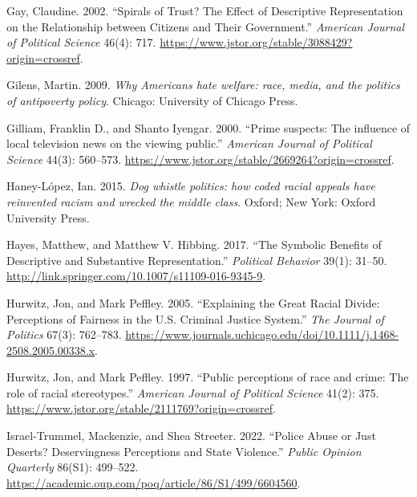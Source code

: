 \documentclass[
  12pt,
]{article}
\newlength{\cslhangindent}
\newlength{\cslentryspacingunit} %
\newenvironment{CSLReferences}[2] %
 {%
  \setlength{\parindent}{0pt}
  \ifodd #1
  \let\oldpar\par
  \def\par{\hangindent=\cslhangindent\oldpar}
  \fi
  \setlength{\parskip}{#2\cslentryspacingunit}
 }%
 {}
\begin{document}
\begin{CSLReferences}{1}{0}
\leavevmode{}%
Gay, Claudine. 2002. {``Spirals of Trust? The Effect of Descriptive
Representation on the Relationship between Citizens and Their
Government.''} \emph{American Journal of Political Science} 46(4): 717.
\url{https://www.jstor.org/stable/3088429?origin=crossref}.

\leavevmode{}%
Gilens, Martin. 2009. \emph{Why Americans hate welfare: race, media, and
the politics of antipoverty policy}. Chicago: University of Chicago
Press.

\leavevmode{}%
Gilliam, Franklin D., and Shanto Iyengar. 2000. {``Prime suspects: The
influence of local television news on the viewing public.''}
\emph{American Journal of Political Science} 44(3): 560--573.
\url{https://www.jstor.org/stable/2669264?origin=crossref}.

\leavevmode{}%
Haney-López, Ian. 2015. \emph{Dog whistle politics: how coded racial
appeals have reinvented racism and wrecked the middle class}. Oxford;
New York: Oxford University Press.

\leavevmode{}%
Hayes, Matthew, and Matthew V. Hibbing. 2017. {``The Symbolic Benefits
of Descriptive and Substantive Representation.''} \emph{Political
Behavior} 39(1): 31--50.
\url{http://link.springer.com/10.1007/s11109-016-9345-9}.

\leavevmode{}%
Hurwitz, Jon, and Mark Peffley. 2005. {``Explaining the Great Racial
Divide: Perceptions of Fairness in the U.S. Criminal Justice System.''}
\emph{The Journal of Politics} 67(3): 762--783.
\url{https://www.journals.uchicago.edu/doi/10.1111/j.1468-2508.2005.00338.x}.

\leavevmode{}%
Hurwitz, Jon, and Mark Peffley. 1997. {``Public perceptions of race and
crime: The role of racial stereotypes.''} \emph{American Journal of
Political Science} 41(2): 375.
\url{https://www.jstor.org/stable/2111769?origin=crossref}.

\leavevmode{}%
Israel-Trummel, Mackenzie, and Shea Streeter. 2022. {``Police Abuse or
Just Deserts? Deservingness Perceptions and State Violence.''}
\emph{Public Opinion Quarterly} 86(S1): 499--522.
\url{https://academic.oup.com/poq/article/86/S1/499/6604560}.


\end{CSLReferences}
\end{document}
